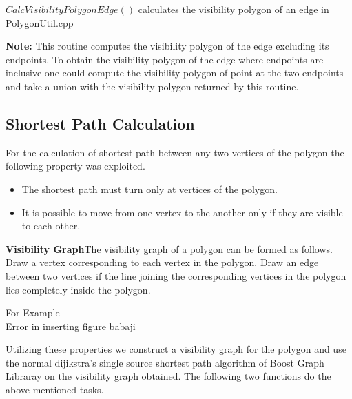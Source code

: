 $CalcVisibilityPolygonEdge()$ calculates the visibility polygon of an edge in PolygonUtil.cpp

{\bf Note:}
This routine computes the visibility polygon of the edge excluding its endpoints. To obtain the visibility polygon of the edge where
endpoints are inclusive one could compute the visibility polygon of point at the two endpoints and take a union with the visibility
polygon returned by this routine.




\subsection{Shortest Path Calculation}
For the calculation of shortest path between any two vertices of the polygon the following property was exploited.
\begin{itemize}
 \item The shortest path must turn only at vertices of the polygon.
 \item It is possible to move from one vertex to the another only if they are visible to each other.
\end{itemize}

\begin{definition}
{\bf Visibility Graph}The visibility graph of a polygon can be formed as follows. Draw a vertex corresponding to each vertex in the 
polygon. Draw an edge between two vertices if the line joining the corresponding vertices in the polygon lies completely inside the 
polygon.
\end{definition}

For Example \\

Error in inserting figure babaji

Utilizing these properties we construct a visibility graph for the polygon and use the normal dijikstra's single source shortest path
algorithm of Boost Graph Libraray \cite{BOOST} on the visibility graph obtained. The following two functions do the above mentioned tasks.



